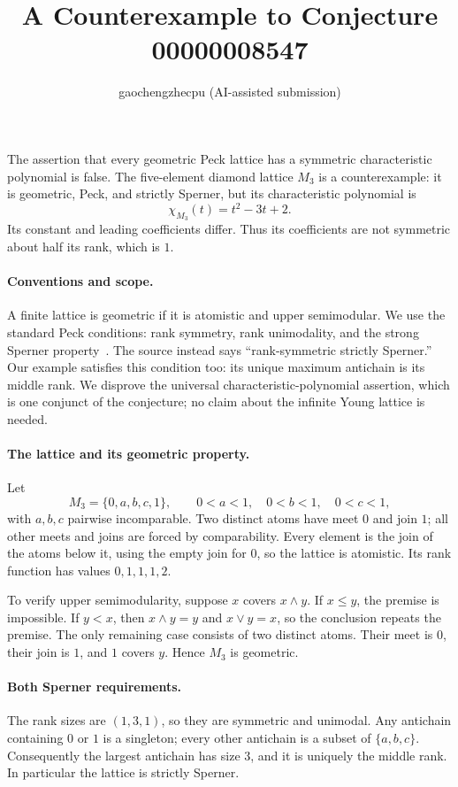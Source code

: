 \documentclass[11pt]{article}
\title{A Counterexample to Conjecture 00000008547}
\author{gaochengzhecpu (AI-assisted submission)}
\date{}
\begin{document}
\maketitle

The assertion that every geometric Peck lattice has a symmetric
characteristic polynomial is false.  The five-element diamond lattice
$M_3$ is a counterexample: it is geometric, Peck, and strictly Sperner,
but its characteristic polynomial is
\[
\chi_{M_3}(t)=t^2-3t+2.
\]
Its constant and leading coefficients differ.  Thus its coefficients
are not symmetric about half its rank, which is $1$.

\paragraph{Conventions and scope.}
A finite lattice is geometric if it is atomistic and upper semimodular.
We use the standard Peck conditions: rank symmetry, rank unimodality,
and the strong Sperner property~\cite{stanley}.
The source instead says ``rank-symmetric strictly Sperner.''
Our example satisfies this condition too: its unique maximum antichain
is its middle rank.  We disprove the universal characteristic-polynomial
assertion, which is one conjunct of the conjecture; no claim about the
infinite Young lattice is needed.

\paragraph{The lattice and its geometric property.}
Let
\[
M_3=\{0,a,b,c,1\},\qquad
0<a<1,\quad 0<b<1,\quad 0<c<1,
\]
with $a,b,c$ pairwise incomparable.  Two distinct atoms have meet $0$
and join $1$; all other meets and joins are forced by comparability.
Every element is the join of the atoms below it, using the empty join
for $0$, so the lattice is atomistic.  Its rank function has values
$0,1,1,1,2$.

To verify upper semimodularity, suppose $x$ covers $x\wedge y$.
If $x\leq y$, the premise is impossible.  If $y<x$, then
$x\wedge y=y$ and $x\vee y=x$, so the conclusion repeats the premise.
The only remaining case consists of two distinct atoms.  Their meet
is $0$, their join is $1$, and $1$ covers $y$.
Hence $M_3$ is geometric.

\paragraph{Both Sperner requirements.}
The rank sizes are $(1,3,1)$, so they are symmetric and unimodal.
Any antichain containing $0$ or $1$ is a singleton; every other
antichain is a subset of $\{a,b,c\}$.  Consequently the largest
antichain has size $3$, and it is uniquely the middle rank.
In particular the lattice is strictly Sperner.
\end{document}
